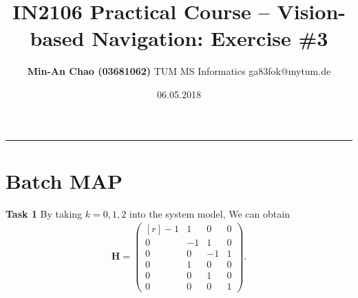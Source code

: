 \documentclass[12pt,a4paper]{article}
\makeatletter
\newcommand{\docTitle}{IN2106 Practical Course -- Vision-based Navigation: Exercise \#3}
\newcommand{\docAuthor}{Min-An Chao (03681062)}
\newcommand{\docAuthorDept}{TUM MS Informatics}
\newcommand{\docAuthorEmail}{ga83fok@mytum.de}
\newcommand{\docDate}{06.05.2018}
\newcommand{\mtx}[1]{\mathbf{#1}}
\makeatother
\begin{document}
    \title{\vspace{-1.75cm} \large \textsf{\textbf{\docTitle}}}
    \author{\normalsize \textsf{
        \textbf{\docAuthor} \hspace{6pt}\textbar\hspace{6pt}
        \docAuthorDept \hspace{6pt}\textbar\hspace{6pt}
        \docAuthorEmail}}
    \date{\small \textsf{\docDate}}
    \maketitle 
    \thispagestyle{fancy}
    \vspace{-0.5cm}
    \hrule

    \section{Batch MAP}
    
    \textsf{\textbf{Task 1}}
    By taking $k=0,1,2$ into the system model,
    We can obtain
    \begin{eqnarray}\label{eq:h_matrix}
      \mtx{H} =
      \begin{pmatrix}[r]
        -1 &  1 &  0 & 0 \\
         0 & -1 &  1 & 0 \\
         0 &  0 & -1 & 1 \\
         0 &  1 &  0 & 0 \\
         0 &  0 &  1 & 0 \\
         0 &  0 &  0 & 1
      \end{pmatrix}.
    \end{eqnarray}
\end{document}
